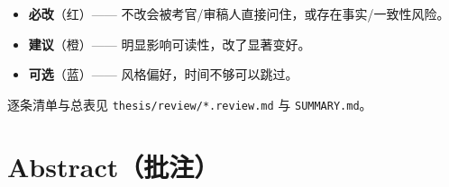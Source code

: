 \begin{itemize}
\tightlist
\item
  \textbf{必改}（红）------
  不改会被考官/审稿人直接问住，或存在事实/一致性风险。
\item
  \textbf{建议}（橙）------ 明显影响可读性，改了显著变好。
\item
  \textbf{可选}（蓝）------ 风格偏好，时间不够可以跳过。
\end{itemize}

逐条清单与总表见 \texttt{thesis/review/*.review.md} 与
\texttt{SUMMARY.md}。

\clearpage

\chapter{Abstract（批注）}\label{abstractux6279ux6ce8}

